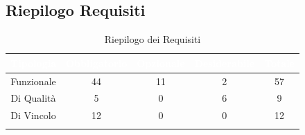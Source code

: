 \subsection{Riepilogo Requisiti}\label{Riepilogo}
\begin{center}
\begin{longtable}[c]{|c|c|c|c|c|}
\hline
\rowcolor{bluelogo}\textbf{\textcolor{white}{Tipologia}} & \textbf{\textcolor{white}{Obbligatorio}} & \textbf{\textcolor{white}{Opzionale}} & \textbf{\textcolor{white}{Desiderabile}} & \textbf{\textcolor{white}{Totale}}\\
\hline \hline
\endhead
Funzionale & 44 & 11 & 2 & 57\\
\hline
\rowcolor{grigio}Di Qualità & 5 & 0 & 6 & 9\\
\hline
Di Vincolo & 12 & 0 & 0 & 12\\
\hline
\caption{Riepilogo dei Requisiti}
\end{longtable}
\end{center}